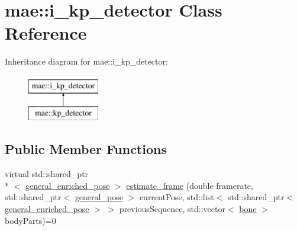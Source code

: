 \hypertarget{classmae_1_1i__kp__detector}{\section{mae\-:\-:i\-\_\-kp\-\_\-detector Class Reference}
\label{classmae_1_1i__kp__detector}
}
Inheritance diagram for mae\-:\-:i\-\_\-kp\-\_\-detector\-:\begin{figure}[H]
\begin{center}
\leavevmode
\includegraphics[height=2.000000cm]{classmae_1_1i__kp__detector}
\end{center}
\end{figure}
\subsection*{Public Member Functions}
\begin{DoxyCompactItemize}
\item 
virtual std\-::shared\-\_\-ptr\\*
$<$ \hyperlink{classmae_1_1general__enriched__pose}{general\-\_\-enriched\-\_\-pose} $>$ \hyperlink{classmae_1_1i__kp__detector_a42a950416d5bc959544c0138a8526847}{estimate\-\_\-frame} (double framerate, std\-::shared\-\_\-ptr$<$ \hyperlink{classmae_1_1general__pose}{general\-\_\-pose} $>$ current\-Pose, std\-::list$<$ std\-::shared\-\_\-ptr$<$ \hyperlink{classmae_1_1general__enriched__pose}{general\-\_\-enriched\-\_\-pose} $>$ $>$ previous\-Sequence, std\-::vector$<$ \hyperlink{classmae_1_1bone}{bone} $>$ body\-Parts)=0
\end{DoxyCompactItemize}


